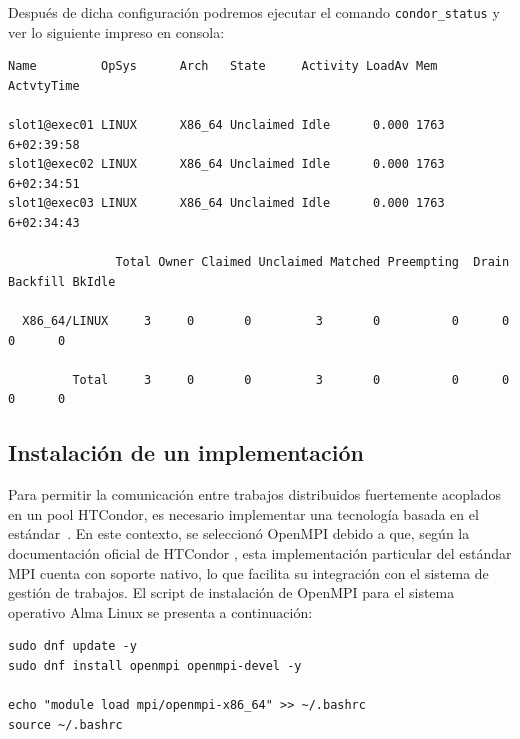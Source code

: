 Después de dicha configuración podremos ejecutar el comando \texttt{condor\_status} y ver lo siguiente impreso en consola:

\begin{verbatim}
Name         OpSys      Arch   State     Activity LoadAv Mem   ActvtyTime

slot1@exec01 LINUX      X86_64 Unclaimed Idle      0.000 1763  6+02:39:58
slot1@exec02 LINUX      X86_64 Unclaimed Idle      0.000 1763  6+02:34:51
slot1@exec03 LINUX      X86_64 Unclaimed Idle      0.000 1763  6+02:34:43

               Total Owner Claimed Unclaimed Matched Preempting  Drain Backfill BkIdle

  X86_64/LINUX     3     0       0         3       0          0      0        0      0

         Total     3     0       0         3       0          0      0        0      0

\end{verbatim}


\FloatBarrier\subsection{Instalación de un implementación \MPI}

Para permitir la comunicación entre trabajos distribuidos fuertemente acoplados en un pool HTCondor, es necesario implementar una tecnología basada en el estándar~\MPI. En este contexto, se seleccionó OpenMPI debido a que, según la documentación oficial de HTCondor \cite{HTCondor_Parallel}, esta implementación particular del estándar MPI cuenta con soporte nativo, lo que facilita su integración con el sistema de gestión de trabajos. El script de instalación de OpenMPI para el sistema operativo Alma Linux se presenta a continuación:

\begin{verbatim}
sudo dnf update -y
sudo dnf install openmpi openmpi-devel -y

echo "module load mpi/openmpi-x86_64" >> ~/.bashrc
source ~/.bashrc
\end{verbatim}

